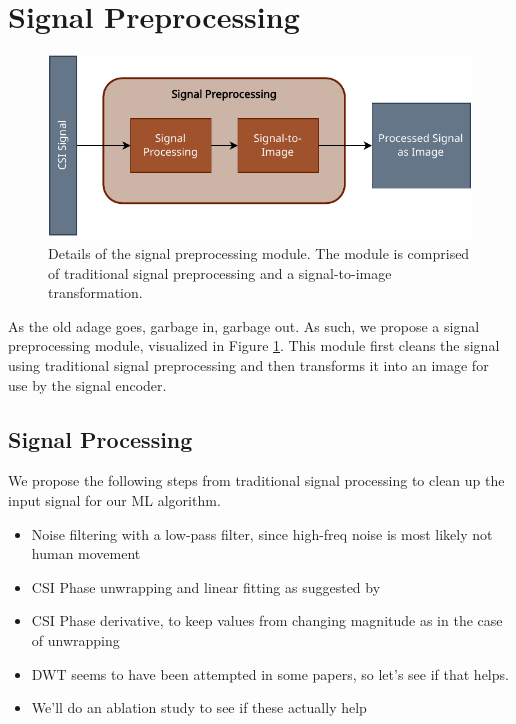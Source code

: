 
\section{Signal Preprocessing}\label{sec:methodology-signal-preprocessing}

\begin{figure}
	\centering
	\includegraphics[width=0.8\linewidth]{figures/signal_preprocessing_diagram.pdf}
	\caption{Details of the signal preprocessing module. The module is comprised of traditional signal preprocessing and a signal-to-image transformation.}
	\label{fig:signal-preprocessing-diagram}
\end{figure}

As the old adage goes, garbage in, garbage out.
As such, we propose a signal preprocessing module, visualized in Figure \ref{fig:signal-preprocessing-diagram}.
This module first cleans the signal using traditional signal preprocessing and then transforms it into an image for use by the signal encoder.

\subsection{Signal Processing}

We propose the following steps from traditional signal processing to clean up the input signal for our ML algorithm.

\begin{itemize}
	\item Noise filtering with a low-pass filter, since high-freq noise is most likely not human movement
	\item CSI Phase unwrapping and linear fitting as suggested by \cite{geng2022densepose}
	\item CSI Phase derivative, to keep values from changing magnitude as in the case of unwrapping
	\item DWT seems to have been attempted in some papers, so let's see if that helps.
	\item We'll do an ablation study to see if these actually help
\end{itemize}

